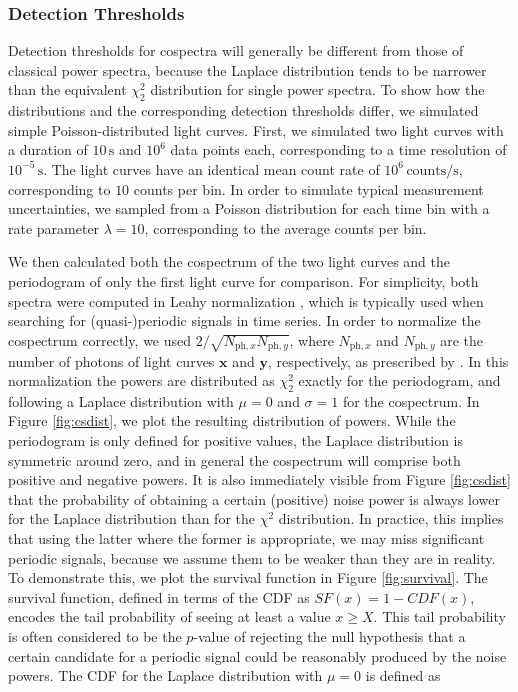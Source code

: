 \documentclass[12pt]{emulateapj}
\begin{document}
\subsubsection{Detection Thresholds}
\label{sec:detectionthresholds}

Detection thresholds for cospectra will generally be different from those of classical power spectra, because the Laplace distribution tends to be narrower than the equivalent $\chi^2_2$ distribution for single power spectra. To show how the distributions and the corresponding detection thresholds differ, we simulated simple Poisson-distributed light curves. First, we simulated two light curves with a duration of $10\,\mathrm{s}$ and $10^6$ data points each, corresponding to a time resolution of $10^{-5}\,\mathrm{s}$. The light curves have an identical mean count rate of $10^{6} \, \mathrm{counts/s}$, corresponding to $10$ counts per bin. In order to simulate typical measurement uncertainties, we sampled from a Poisson distribution for each time bin with a rate parameter $\lambda = 10$, corresponding to the average counts per bin.

We then calculated both the cospectrum of the two light curves and the periodogram of only the first light curve for comparison. For simplicity, both spectra were computed in Leahy normalization \citep{leahy1983}, which is typically used when searching for (quasi-)periodic signals in time series.
In order to normalize the cospectrum correctly, we used $2/\sqrt{N_{\mathrm{ph}, x}N_{\mathrm{ph}, y}}$, where $N_{\mathrm{ph}, x}$ and $N_{\mathrm{ph}, y}$ are the number of photons of light curves $\mathbf{x}$ and $\mathbf{y}$, respectively, as prescribed by \citet{Bachetti+15}.
In this normalization the powers are distributed as $\chi^2_2$ exactly for the periodogram, and following a Laplace distribution with $\mu=0$ and $\sigma = 1$ for the cospectrum. In Figure \ref{fig:csdist}, we plot the resulting distribution of powers. While the periodogram is only defined for positive values, the Laplace distribution is symmetric around zero, and in general the cospectrum will comprise both positive and negative powers. It is also immediately visible from Figure \ref{fig:csdist} that the probability of obtaining a certain (positive) noise power is always lower for the Laplace distribution than for the $\chi^2$ distribution. In practice, this implies that using the latter where the former is appropriate, we may miss significant periodic signals, because we assume them to be weaker than they are in reality. To demonstrate this, we plot the survival function in Figure \ref{fig:survival}. The survival function, defined in terms of the CDF as $SF(x) = 1 - CDF(x)$, encodes the tail probability of seeing at least a value $x \geq X$. This tail probability is often considered to be the $p$-value of rejecting the null hypothesis that a certain candidate for a periodic signal could be reasonably produced by the noise powers. The CDF for the Laplace distribution with $\mu=0$ is defined as 
\end{document}
